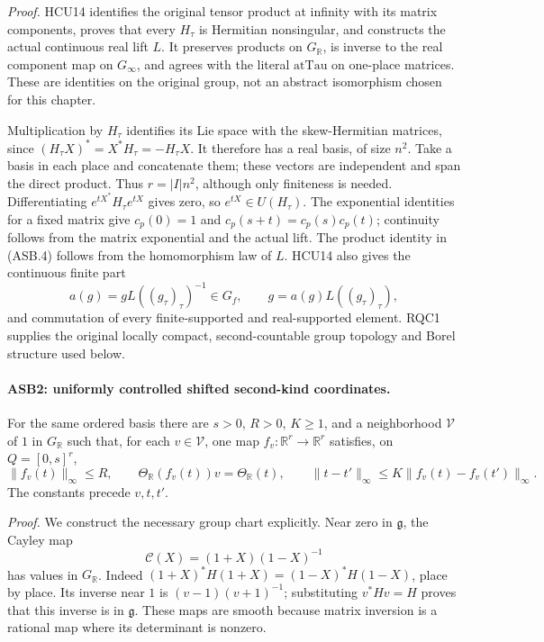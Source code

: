\emph{Proof.}
HCU14 identifies the original tensor product at infinity with its
matrix components, proves that every \(H_\tau\) is Hermitian
nonsingular, and constructs the actual continuous real lift \(L\).
It preserves products on \(G_{\mathbb R}\), is inverse to the real
component map on \(G_\infty\), and agrees with the literal
\(\mathrm{atTau}\) on one-place matrices.
These are identities on the original group, not an abstract
isomorphism chosen for this chapter.

Multiplication by \(H_\tau\) identifies its Lie space with the
skew-Hermitian matrices, since
\((H_\tau X)^*=X^*H_\tau=-H_\tau X\).
It therefore has a real basis, of size \(n^2\).  Take a basis in each
place and concatenate them; these vectors are independent and span
the direct product.  Thus \(r=|I|n^2\), although only finiteness is
needed.  Differentiating
\(e^{tX^*}H_\tau e^{tX}\) gives zero, so \(e^{tX}\in U(H_\tau)\).
The exponential identities for a fixed matrix give
\(c_p(0)=1\) and \(c_p(s+t)=c_p(s)c_p(t)\); continuity follows
from the matrix exponential and the actual lift.
The product identity in (ASB.4) follows from the homomorphism law of
\(L\).  HCU14 also gives the continuous finite part
\[
 a(g)=gL((g_\tau)_\tau)^{-1}\in G_f,
 \qquad g=a(g)L((g_\tau)_\tau),
 \tag{ASB.5}
\]
and commutation of every finite-supported and real-supported element.
RQC1 supplies the original locally compact, second-countable group
topology and Borel structure used below.

\paragraph{ASB2: uniformly controlled shifted second-kind coordinates.}
\label{claim:ASB2}
For the same ordered basis there are \(s>0\), \(R>0\), \(K\ge1\),
and a neighborhood \(\mathcal V\) of \(1\) in \(G_{\mathbb R}\)
such that, for each \(v\in\mathcal V\), one map
\(f_v:\mathbb R^r\to\mathbb R^r\) satisfies, on \(Q=[0,s]^r\),
\[
 \|f_v(t)\|_\infty\le R,\qquad
 \Theta_{\mathbb R}(f_v(t))v=\Theta_{\mathbb R}(t),\qquad
 \|t-t'\|_\infty\le K\|f_v(t)-f_v(t')\|_\infty.
 \tag{ASB.6}
\]
The constants precede \(v,t,t'\).

\emph{Proof.}
We construct the necessary group chart explicitly.  Near zero in
\(\mathfrak g\), the Cayley map
\[
 \mathcal C(X)=(1+X)(1-X)^{-1}
 \tag{ASB.7}
\]
has values in \(G_{\mathbb R}\).  Indeed
\((1+X)^*H(1+X)=(1-X)^*H(1-X)\), place by place.
Its inverse near \(1\) is \((v-1)(v+1)^{-1}\); substituting
\(v^*Hv=H\) proves that this inverse is in \(\mathfrak g\).
These maps are smooth because matrix inversion is a rational map
where its determinant is nonzero.

